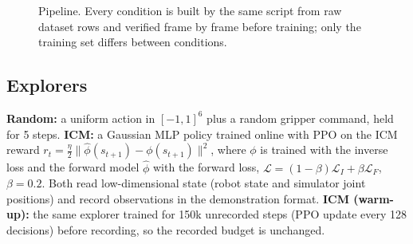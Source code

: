 \documentclass[conference]{IEEEtran}
\begin{document}
\begin{figure}[t]\centering
{}
\caption{Pipeline. Every condition is built by the same script from raw dataset rows and verified frame by frame before training; only the training set differs between conditions.}
\label{fig:arch}
\end{figure}

\subsection{Explorers}
\textbf{Random:} a uniform action in $[-1,1]^6$ plus a random gripper command, held for 5 steps. \textbf{ICM:} a Gaussian MLP policy trained online with PPO on the ICM reward $r_t=\tfrac{\eta}{2}\lVert\hat\phi(s_{t+1})-\phi(s_{t+1})\rVert^2$, where $\phi$ is trained with the inverse loss and the forward model $\hat\phi$ with the forward loss, $\mathcal{L}=(1-\beta)\mathcal{L}_I+\beta\mathcal{L}_F$, $\beta=0.2$. Both read low-dimensional state (robot state and simulator joint positions) and record observations in the demonstration format. \textbf{ICM (warm-up):} the same explorer trained for 150k unrecorded steps (PPO update every 128 decisions) before recording, so the recorded budget is unchanged.
\end{document}
